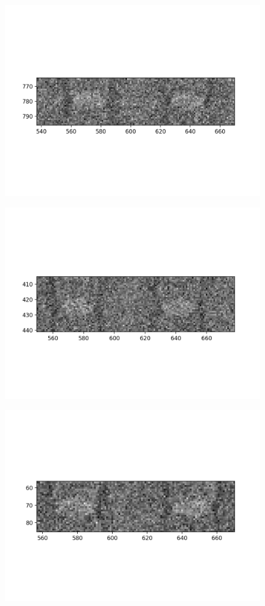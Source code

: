 \documentclass[10pt,a4paper]{article}
\begin{document}
\begin{figure}
	\includegraphics{data/image_stamps/a7}
\end{figure}
\begin{figure}
	\includegraphics{data/image_stamps/a8}
\end{figure}
\begin{figure}
	\includegraphics{data/image_stamps/a9}
\end{figure}
\end{document}
